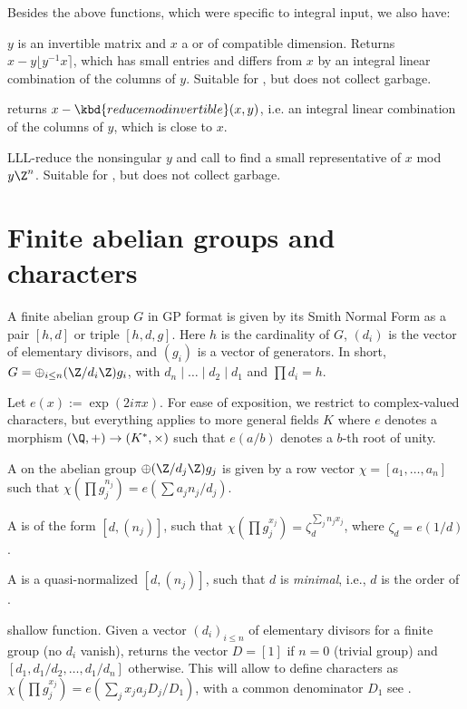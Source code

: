 Besides the above functions, which were specific to integral input, we also
have:

 $y$ is an invertible matrix
and $x$ a  or  of compatible dimension.
Returns $x - y\lfloor y^{-1}x \rceil$, which has small entries and differs
from $x$ by an integral linear combination of the columns of $y$. Suitable
for , but does not collect garbage.

 returns $x -
\kbd{reducemodinvertible}(x,y)$, i.e. an integral linear combination of
the columns of $y$, which is close to $x$.

 LLL-reduce the nonsingular  $y$
and call  to find a small representative of $x$ mod $y
\Z^n$. Suitable for , but does not collect garbage.

\section{Finite abelian groups and characters}


A finite abelian group $G$ in GP format is given by its Smith
Normal Form as a pair $[h,d]$ or triple $[h,d,g]$.
Here $h$ is the cardinality of $G$, $(d_i)$ is the vector of elementary
divisors, and $(g_i)$ is a vector of generators. In short,
$G = \oplus_{i\leq n} (\Z/d_i\Z) g_i$, with $d_n \mid \dots \mid d_2 \mid d_1$
and $\prod d_i = h$.

Let $e(x) := \exp(2i\pi x)$. For ease of exposition, we restrict to
complex-valued characters, but everything applies to more general fields $K$
where $e$ denotes a morphism $(\Q,+) \to (K^*,\times)$ such that $e(a/b)$
denotes a $b$-th root of unity.

A  on the abelian group $\oplus (\Z/d_j\Z) g_j$
is given by a row vector $\chi = [a_1,\ldots,a_n]$ such that
$\chi(\prod g_j^{n_j}) = e(\sum a_j n_j / d_j)$.

A  is of the form $[d, (n_j)]$, such that
$\chi(\prod g_j^{x_j}) = \zeta_d^{\sum_j n_j x_j}$, where $\zeta_d =
e(1/d)$.

A  is a quasi-normalized $[d, (n_j)]$, such that
$d$ is \emph{minimal}, i.e., $d$ is the order of .

 shallow function. Given a vector
$(d_i)_{i \leq n}$
of elementary divisors for a finite group (no $d_i$ vanish), returns the vector
$D = [1]$ if $n = 0$ (trivial group) and
 $[d_1, d_1/d_2, \dots, d_1/d_n]$ otherwise. This will allow to define
characters as $\chi(\prod g_j^{x_j}) = e(\sum_j x_j a_j D_j / D_1)$,
with a common denominator $D_1$ see .

